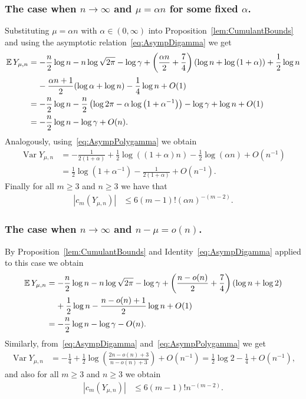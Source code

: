 \documentclass[AHL,Unicode,longabstracts,published]{cedram}
\newcommand{\EE}{\mathbb{E}\,}
\newcommand{\Var}{\mathop{\mathrm{Var}}\nolimits}
\begin{document}
\subsubsection{The case when $n\rightarrow \infty$ and $\mu=\alpha n$ for some fixed $\alpha$.}
Substituting $\mu=\alpha n$ with $\alpha\in(0,\infty)$ into Proposition~\ref{lem:CumulantBounds} and using the asymptotic relation~\eqref{eq:AsympDigamma} we get
\begin{align*}
\EE Y_{\mu,n}&=-\frac{n}{2}\log n-n\log\sqrt{2\pi}-\log\gamma +\left(\frac{\alpha n}{2}+\frac{7}{4}\right)(\log n + \log\left(1+\alpha\right))+\frac{1}{2}\log n\\[0.20em]
&\mkern20mu-\frac{\alpha n+1}{2}(\log\alpha +\log n)-\frac{1}{4}\log n+O(1)\\
&=-\frac{n}{2}\log n-\frac{n}{2}\left(\log 2\pi-\alpha\log\left(1+\alpha^{-1}\right)\right)-\log\gamma +\log n+O(1)\\
&= -\frac{n}{2}\log n-\log\gamma + O(n).
\end{align*}
Analogously, using~\eqref{eq:AsympPolygamma} we obtain
\begin{align*}
\Var Y_{\mu,n}&=-\frac{1}{2(1+\alpha)}+\frac12\log((1+\alpha)n)-\frac12\log(\alpha n)+O\left(n^{-1}\right)\\
&= \frac12\log\left(1+\alpha^{-1}\right)-\frac{1}{2(1+\alpha)}+O\left(n^{-1}\right).
\end{align*}
Finally for all $m\geq 3$ and $n\geq 3$ we have that
\begin{align*}
|c_m(Y_{\mu,n})|&\leq 6(m-1)!(\alpha n)^{-(m-2)}.
\end{align*}

\subsubsection{The case when $n\rightarrow \infty$ and $n-\mu = o(n)$.}
By Proposition~\ref{lem:CumulantBounds} and Identity~\eqref{eq:AsympDigamma} applied to this case we obtain
\begin{align*}
\EE Y_{\mu,n}&=-\frac{n}{2}\log n-n\log\sqrt{2\pi}-\log\gamma +\left(\frac{n-o(n)}{2}+\frac{7}{4}\right)(\log n+\log 2)\\
&\mkern20mu+\frac{1}{2}\log n-\frac{n-o(n)+1}{2}\log n+O(1)\\
&= -\frac{n}{2}\log n-\log\gamma - O(n).
\end{align*}
Similarly, from~\eqref{eq:AsympDigamma} and~\eqref{eq:AsympPolygamma} we get
\begin{align*}
\Var Y_{\mu,n}&=-\frac{1}{4}+\frac12\log\left(\frac{2n-o(n)+3}{n-o(n)+3 }\right)+O\left(n^{-1}\right)=\frac{1}{2}\log 2-\frac{1}{4}+O\left(n^{-1}\right),
\end{align*}
and also for all $m\geq 3$ and $n\geq 3$ we obtain
\begin{align*}
|c_m(Y_{\mu,n})|&\leq 6(m-1)!n^{-(m-2)}.
\end{align*}
\end{document}

